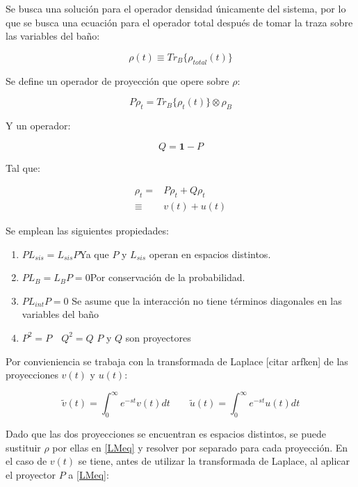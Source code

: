 \documentclass[a4paper,10pt]{report}
\begin{document}
Se busca una solución para el operador densidad únicamente del sistema, por lo que se busca una ecuación para el operador total después de tomar la traza sobre las variables del baño:

\begin{equation}
\rho(t) \equiv Tr_B\{\rho_{total}(t)\}
\end{equation}

Se define un operador de proyección \cite{ZollerQN} que opere sobre $ \rho $:

\begin{equation}
P\rho_t = Tr_B\{\rho_{t}(t)\}\otimes \rho_B
\end{equation}

Y un operador:

\begin{equation}
Q = \mathbf{1}-P
\end{equation}

Tal que:

\begin{align}
\rho_t =& P\rho_t + Q\rho_t \\
\equiv & v(t)+u(t)
\end{align}

Se emplean las siguientes propiedades:

\begin{enumerate}
\item $ PL_{sis} = L_{sis}P$\qquad Ya que $ P $ y $ L_{sis} $ operan en espacios distintos.

\item $ PL_{B} = L_{B}P = 0 $\qquad Por conservación de la probabilidad.

\item $PL_{int}P=0$ \qquad Se asume que la interacción no tiene términos diagonales en las variables del baño

\item $P^2 = P \quad Q^2 = Q$ \qquad $P$ y $Q$ son proyectores
\end{enumerate}

Por convieniencia se trabaja con la transformada de Laplace [citar arfken] de las proyecciones $v(t)$ y $u(t)$:

\begin{equation}
\tilde{v}(t) = \int_0^\infty e^{-st}v(t)dt \qquad \tilde{u}(t) = \int_0^\infty e^{-st}u(t)dt
\end{equation}

Dado que las dos proyecciones se encuentran es espacios distintos, se puede sustituir $\rho$ por ellas en \eqref{LMeq} y resolver por separado para cada proyección. En el caso de $v(t)$ se tiene, antes de utilizar la transformada de Laplace, al aplicar el proyector $P$ a \eqref{LMeq}:
\end{document}
